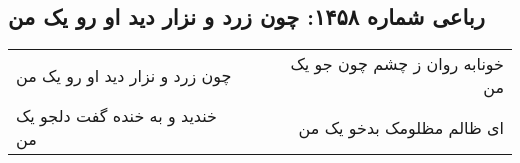 \begin{center}
\section*{رباعی شماره ۱۴۵۸: چون زرد و نزار دید او رو یک من}
\label{sec:1458}
\begin{longtable}{l p{0.5cm} r}
چون زرد و نزار دید او رو یک من
&&
خونابه روان ز چشم چون جو یک من
\\
خندید و به خنده گفت دلجو یک من
&&
ای ظالم مظلومک بدخو یک من
\\
\end{longtable}
\end{center}
